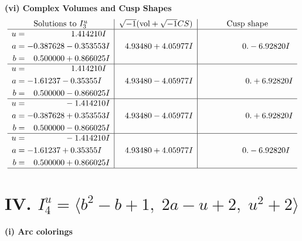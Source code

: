 \documentclass[1p]{elsarticle_modified}
\theoremstyle{definition}
\newcommand{\I}{\sqrt{-1}}
\begin{document}
\newpage\flushleft \textbf{(vi) Complex Volumes and Cusp Shapes}
$$\begin{array}{c|c|c}  
\text{Solutions to }I^u_{3}& \I (\text{vol} + \sqrt{-1}CS) & \text{Cusp shape}\\
 \hline 
\begin{aligned}
u &= \phantom{-0.000000 -}1.414210 I \\
a &= -0.387628 - 0.353553 I \\
b &= \phantom{-}0.500000 + 0.866025 I\end{aligned}
 & \phantom{-}4.93480 + 4.05977 I & \phantom{-0.000000 } 0. - 6.92820 I \\ \hline\begin{aligned}
u &= \phantom{-0.000000 -}1.414210 I \\
a &= -1.61237 - 0.35355 I \\
b &= \phantom{-}0.500000 - 0.866025 I\end{aligned}
 & \phantom{-}4.93480 - 4.05977 I & \phantom{-0.000000 -}0. + 6.92820 I \\ \hline\begin{aligned}
u &= \phantom{-0.000000 } -1.414210 I \\
a &= -0.387628 + 0.353553 I \\
b &= \phantom{-}0.500000 - 0.866025 I\end{aligned}
 & \phantom{-}4.93480 - 4.05977 I & \phantom{-0.000000 -}0. + 6.92820 I \\ \hline\begin{aligned}
u &= \phantom{-0.000000 } -1.414210 I \\
a &= -1.61237 + 0.35355 I \\
b &= \phantom{-}0.500000 + 0.866025 I\end{aligned}
 & \phantom{-}4.93480 + 4.05977 I & \phantom{-0.000000 } 0. - 6.92820 I\\
 \hline 
 \end{array}$$\newpage\newpage\renewcommand{\arraystretch}{1}
\centering \section*{IV. $I^u_{4}= \langle b^2- b+1,\;2 a- u+2,\;u^2+2 \rangle$}
\flushleft \textbf{(i) Arc colorings}\\
\end{document}
